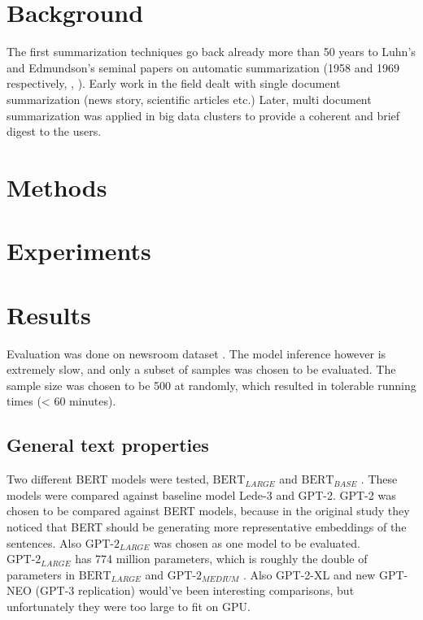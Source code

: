 \documentclass{article}
\newcommand{\bertlarge}{$\text{BERT}_{LARGE}$ }
\newcommand{\bertbase}{$\text{BERT}_{BASE}$ }
\newcommand{\gptmedium}{$\text{GPT-2}_{MEDIUM}$ }
\newcommand{\gptlarge}{$\text{GPT-2}_{LARGE}$ }
\begin{document}
\section{Background}
The first summarization techniques go back already more than 50 years to Luhn’s and Edmundson’s seminal papers on automatic summarization (1958 and 1969 respectively, \cite{textmining1958}, \cite{automaticextracting}). Early work in the field dealt with single document summarization (news story, scientific articles etc.) Later, multi document summarization was applied in big data clusters to provide a coherent and brief digest to the users. \\



\section{Methods}


\section{Experiments}



\section{Results}

Evaluation was done on newsroom dataset \cite{dataset}. The model inference however is extremely slow, and only a subset of samples was chosen to be evaluated. The sample size was chosen to be 500 at randomly, which resulted in tolerable running times (< 60 minutes). 

\subsection{General text properties}

\noindent
Two different BERT models were tested, \bertlarge and \bertbase. These models were compared against baseline model Lede-3 and GPT-2. GPT-2 was chosen to be compared against BERT models, because in the original study \cite{extractive_bert} they noticed that BERT should be generating more representative embeddings of the sentences. Also \gptlarge was chosen as one model to be evaluated. \gptlarge has 774 million parameters, which is roughly the double of parameters in \bertlarge and \gptmedium. Also GPT-2-XL and new GPT-NEO (GPT-3 replication) would've been interesting comparisons, but unfortunately they were too large to fit on GPU.\\
\end{document}

